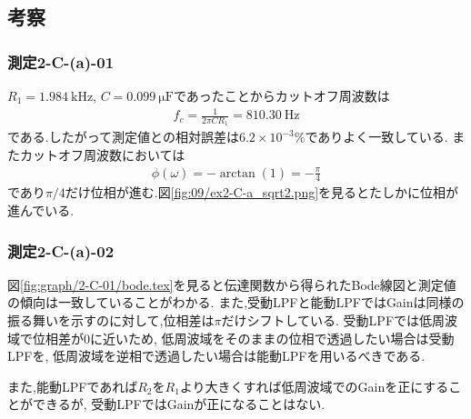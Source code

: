\subsection{考察}
\subsubsection{測定2-C-(a)-01}
$R_1=1.984\ \si{\kilo\hertz}$, $C=0.099\ \si{\micro\farad}$であったことからカットオフ周波数は
\begin{align}
  f_c=\frac{1}{2\pi CR_1}=810.30\ \si{\hertz}
\end{align}
である.したがって測定値との相対誤差は$6.2\times10^{-3}\%$でありよく一致している.
またカットオフ周波数においては
\begin{align}
  \phi(\omega)=-\arctan(1)=-\frac{\pi}{4}
\end{align}
であり$\pi/4$だけ位相が進む.図\ref{fig:09/ex2-C-a_sqrt2.png}を見るとたしかに位相が進んでいる.
\subsubsection{測定2-C-(a)-02}
\label{subsubsec:passiveLPF}
図\ref{fig:graph/2-C-01/bode.tex}を見ると伝達関数から得られたBode線図と測定値の傾向は一致していることがわかる.
また,受動LPFと能動LPFではGainは同様の振る舞いを示すのに対して,位相差は$\pi$だけシフトしている.
受動LPFでは低周波域で位相差が0に近いため,
低周波域をそのままの位相で透過したい場合は受動LPFを,
低周波域を逆相で透過したい場合は能動LPFを用いるべきである.

また,能動LPFであれば$R_2$を$R_1$より大きくすれば低周波域でのGainを正にすることができるが,
受動LPFではGainが正になることはない.